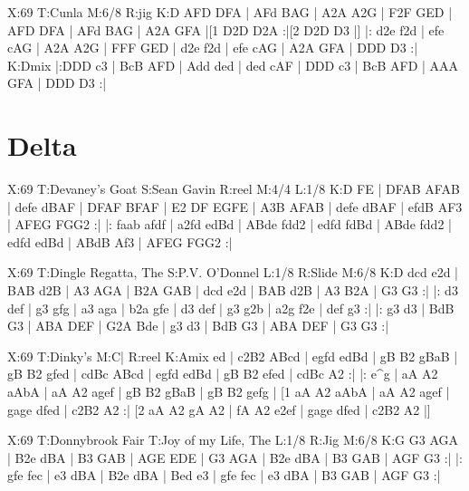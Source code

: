 \documentclass[letterpaper]{article}
\begin{document}
\begin{abc}[name]
X:69
T:Cunla
M:6/8
R:jig
K:D
AFD DFA | AFd BAG | A2A A2G | F2F GED |
AFD DFA | AFd BAG | A2A GFA |[1 D2D D2A :|[2 D2D D3 |]
|: d2e f2d | efe cAG | A2A A2G | FFF GED |
d2e f2d | efe cAG | A2A GFA | DDD D3 :|
K:Dmix
|:DDD c3 | BcB AFD | Add ded | ded cAF |
DDD c3 | BcB AFD | AAA GFA | DDD D3 :|
\end{abc}

\section{Delta}
\begin{abc}[name]
X:69
T:Devaney's Goat
S:Sean Gavin
R:reel
M:4/4
L:1/8
K:D
FE | DFAB AFAB | defe dBAF | DFAF BFAF | E2 DF EGFE |
A3B AFAB | defe dBAF | efdB AF3 | AFEG FGG2 :|
|: faab afdf | a2fd edBd | ABde fdd2 | edfd fdBd |
ABde fdd2 | edfd edBd | ABdB Af3 | AFEG FGG2 :|
\end{abc}

\begin{abc}[name]
X:69
T:Dingle Regatta, The
S:P.V. O'Donnel
L:1/8
R:Slide
M:6/8
K:D
dcd e2d | BAB d2B | A3 AGA | B2A GAB |
dcd e2d | BAB d2B | A3 B2A | G3 G3 :|
|: d3 def | g3 gfg | a3 aga | b2a gfe |
d3 def | g3 g2b | a2g f2e | def g3 :|
|: g3 d3 | BdB G3 | ABA DEF | G2A Bde |
g3 d3 | BdB G3 | ABA DEF | G3 G3 :|
\end{abc}

\begin{abc}[name]
X:69
T:Dinky's
M:C|
R:reel
K:Amix
ed | c2B2 ABcd | egfd edBd | gB B2 gBaB | gB B2 gfed |
cdBc ABcd | egfd edBd | gB B2 efed | cdBc A2 :|
|: e^g | aA A2 aAbA | aA A2 agef | gB B2 gBaB | gB B2 gefg |
[1 aA A2 aAbA | aA A2 agef | gage dfed | c2B2 A2 :|
[2 aA A2 gA A2 | fA A2 e2ef | gage dfed | c2B2 A2 |]
\end{abc}

\begin{abc}[name]
X:69
T:Donnybrook Fair
T:Joy of my Life, The
L:1/8
R:Jig
M:6/8
K:G
G3 AGA | B2e dBA | B3 GAB | AGE EDE |
G3 AGA | B2e dBA | B3 GAB | AGF G3 :|
|: gfe fec | e3 dBA | B2e dBA | Bed e3 |
gfe fec | e3 dBA | B3 GAB | AGF G3 :|
\end{abc}
\end{document}
